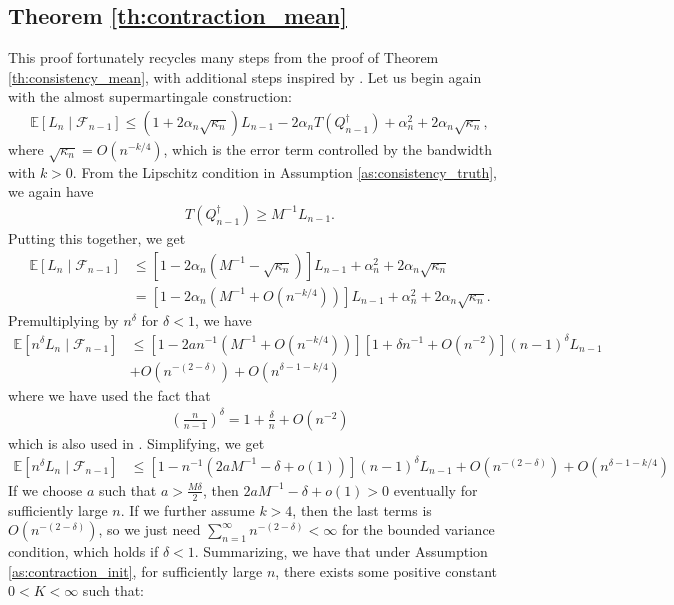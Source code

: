 \documentclass[11pt,a4paper]{article}
\newcommand{\E}{\mathbb{E}}
\begin{document}
\begin{appendices}
\subsection{Theorem \ref{th:contraction_mean} }
This proof fortunately recycles many steps from the proof of {Theorem \ref{th:consistency_mean}}, with additional steps inspired by \cite{Aboubacar2014}. Let us begin again with the almost supermartingale construction:
\begin{align*}
   \E[L_{n} \mid \mathcal{F}_{n-1}] \leq \left(1 + 2\alpha_{n}\sqrt{\kappa_{n}}\right)L_{n-1}-2\alpha_{n}T(Q_{n-1}^{\dagger}) + \alpha_{n}^2 + 2\alpha_{n}\sqrt{\kappa_{n}},
\end{align*}
where  $\sqrt{\kappa_n}  = O(n^{-k/4})$, which is the error term controlled by the bandwidth with $k > 0$. From the Lipschitz condition in {{Assumption \ref{as:consistency_truth}}}, we again have
\begin{align*}
    T(Q_{n-1}^{\dagger}) \geq M^{-1} L_{n-1}.
\end{align*}
Putting this together, we get
\begin{align*}
   \E[L_{n} \mid \mathcal{F}_{n-1}] &\leq \left[1 - 2 \alpha_n\left(M^{-1} -\sqrt{\kappa_n}\right)\right]L_{n-1} + \alpha_{n}^2 + 2\alpha_{n}\sqrt{\kappa_{n}}\\
    &= \left[1 - 2 \alpha_n (M^{-1}+ O(n^{-k/4}))\right]L_{n-1} + \alpha_{n}^2 + 2\alpha_{n}\sqrt{\kappa_{n}}.
\end{align*}
Premultiplying by $n^{\delta}$ for $\delta < 1$, we have
\begin{align*}
   \E[n^{\delta} L_{n} \mid \mathcal{F}_{n-1}] &\leq \left[1 - 2 an^{-1} (M^{-1}+ O(n^{-k/4}))\right][1+\delta n^{-1} + O(n^{-2})] (n-1)^{\delta }L_{n-1} \\
    &+ O\left(n^{-(2-\delta)}\right) + O(n^{\delta - 1 - k/4})
\end{align*}
where we have used the fact that
\begin{align*}
  \left(\frac{n}{n-1}\right)^\delta = 1 + \frac{\delta}{n} + O(n^{-2})
\end{align*}
which is also used in \citet{Aboubacar2014}.
Simplifying, we get
\begin{align*}
   \E[n^{\delta} L_{n} \mid \mathcal{F}_{n-1}] &\leq \left[1 - n^{-1}(2aM^{-1} -\delta + {o}(1))\right] (n-1)^{\delta }L_{n-1} +O\left(n^{-(2-\delta)}\right) + O(n^{\delta - 1 - k/4})
\end{align*}
If we choose $a$ such that $a> \frac{M\delta}{2}$, then $2aM^{-1} - \delta  +o(1)> 0$ eventually for sufficiently large $n$. If we further assume $k > 4$, then the last terms is $O(n^{-(2-\delta)})$, so we just need $\sum_{n = 1}^\infty n^{-(2-\delta)} < \infty$ for the bounded variance condition, which holds if $\delta < 1$. Summarizing, we have that under {Assumption \ref{as:contraction_init}}, for sufficiently large $n$, there exists some positive constant $0 < K <\infty$ such that:

\end{appendices}
\end{document}
